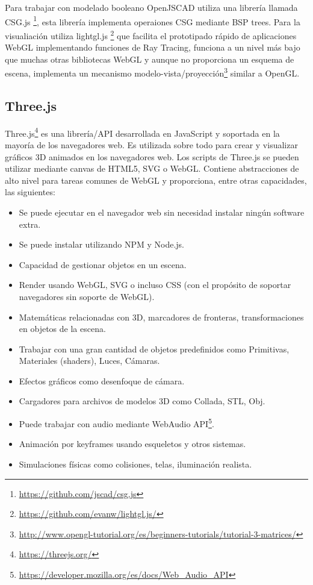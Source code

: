 Para trabajar con modelado booleano OpenJSCAD utiliza una librería llamada CSG.js \footnote{\url{https://github.com/jscad/csg.js}}, esta librería implementa operaiones CSG mediante BSP trees. Para la visualiación utiliza lightgl.js \footnote{\url{https://github.com/evanw/lightgl.js/}} que facilita el prototipado rápido de aplicaciones WebGL implementando funciones de Ray Tracing, funciona a un nivel más bajo que muchas otras bibliotecas WebGL y aunque no proporciona un esquema de escena, implementa un mecanismo modelo-vista/proyección\footnote{\url{http://www.opengl-tutorial.org/es/beginners-tutorials/tutorial-3-matrices/}} similar a OpenGL.

\subsection{Three.js
}

Three.js\footnote{\url{https://threejs.org/}} es una librería/API desarrollada en JavaScript y soportada en la mayoría de los navegadores web. Es utilizada sobre todo para crear y visualizar gráficos 3D animados en los navegadores web. Los scripts de Three.js se pueden utilizar mediante canvas de HTML5, SVG o WebGL. Contiene abstracciones de alto nivel para tareas comunes de WebGL y proporciona, entre otras capacidades, las siguientes:

\begin{itemize}
    \item Se puede ejecutar en el navegador web sin necesidad instalar ningún software extra.
    \item Se puede instalar utilizando NPM y Node.js.
    \item Capacidad de gestionar objetos en un escena.
    \item Render usando WebGL, SVG o incluso CSS (con el propósito de soportar navegadores sin soporte de WebGL).
    \item Matemáticas relacionadas con 3D, marcadores de fronteras, transformaciones en objetos de la escena.
    \item Trabajar con una gran cantidad de objetos predefinidos como Primitivas, Materiales (shaders), Luces, Cámaras.
    \item Efectos gráficos como desenfoque de cámara.
    \item Cargadores para archivos de modelos 3D como Collada, STL, Obj.
    \item Puede trabajar con audio mediante WebAudio API\footnote{\url{https://developer.mozilla.org/es/docs/Web_Audio_API}}.
    \item Animación por keyframes usando esqueletos y otros sistemas.
    \item Simulaciones físicas como colisiones, telas, iluminación realista.
\end{itemize} 

